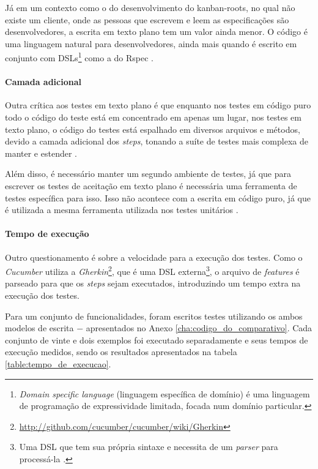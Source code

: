 Já em um contexto como o do desenvolvimento do kanban-roots, no qual não existe um cliente, onde as pessoas que escrevem e leem as especificações são desenvolvedores, a escrita em texto plano tem um valor ainda menor. O código é uma linguagem natural para desenvolvedores, ainda mais quando é escrito em conjunto com DSLs\footnote{\textit{Domain specific language} (linguagem específica de domínio) é uma linguagem de programação de expressividade limitada, focada num domínio particular.}  como a do Rspec \cite{SteakOverCucumber}.


\paragraph{Camada adicional}
\label{sssub:camada_adicional}

Outra crítica aos testes em texto plano é que enquanto nos testes em código puro todo o código do teste está em concentrado em apenas um lugar, nos testes em texto plano, o código do testes está espalhado em diversos arquivos e métodos, devido a camada adicional dos \textit{steps}, tonando a suíte de testes mais complexa de manter e estender \cite{SteakOverCucumber}.

Além disso, é necessário manter um segundo ambiente de testes, já que para escrever os testes de aceitação em texto plano é necessária uma ferramenta de testes específica para isso. Isso não acontece com a escrita em código puro, já que é utilizada a mesma ferramenta utilizada nos testes unitários \cite{WhyBotherWithCucumberTesting}.


\paragraph{Tempo de execução}
\label{sssub:tempo_de_execucao}

Outro questionamento é sobre a velocidade para a execução dos testes. Como o \textit{Cucumber} utiliza a \textit{Gherkin}\footnote{\url{http://github.com/cucumber/cucumber/wiki/Gherkin}}, que é uma DSL externa\footnote{Uma DSL que tem sua própria sintaxe e necessita de um \textit{parser} para processá-la \cite{DSLFowler}.}, o arquivo de \textit{features} é parseado para que os \textit{steps} sejam executados, introduzindo um tempo extra na execução dos testes.

Para um conjunto de funcionalidades, foram escritos testes utilizando os ambos modelos de escrita $-$ apresentados no Anexo \ref{cha:codigo_do_comparativo}. Cada conjunto de vinte e dois exemplos foi executado separadamente e seus tempos de execução medidos, sendo os resultados apresentados na tabela \ref{table:tempo_de_execucao}.

